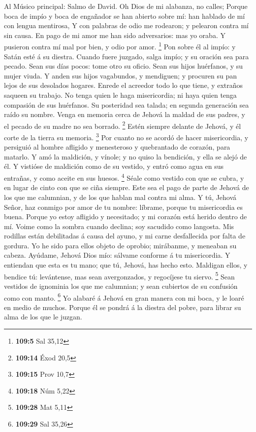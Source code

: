  Al Músico principal: Salmo de David. Oh Dios de mi
alabanza, no calles;  Porque boca de impío y boca de
engañador se han abierto sobre mí: han hablado de mí con lengua
mentirosa,  Y con palabras de odio me rodearon; y pelearon
contra mí sin causa.  En pago de mi amor me han sido
adversarios: mas yo oraba.  Y pusieron contra mí mal por
bien, y odio por amor. \footnote{\textbf{109:5} Sal 35,12} 
Pon sobre él al impío: y Satán esté á su diestra.  Cuando
fuere juzgado, salga impío; y su oración sea para pecado. 
Sean sus días pocos: tome otro su oficio.  Sean sus hijos
huérfanos, y su mujer viuda.  Y anden sus hijos vagabundos,
y mendiguen; y procuren su pan lejos de sus desolados hogares.
 Enrede el acreedor todo lo que tiene, y extraños saqueen
su trabajo.  No tenga quien le haga misericordia; ni haya
quien tenga compasión de sus huérfanos.  Su posteridad sea
talada; en segunda generación sea raído su nombre.  Venga
en memoria cerca de Jehová la maldad de sus padres, y el pecado de su
madre no sea borrado. \footnote{\textbf{109:14} Éxod 20,5} 
Estén siempre delante de Jehová, y él corte de la tierra su memoria.
\footnote{\textbf{109:15} Prov 10,7}  Por cuanto no se
acordó de hacer misericordia, y persiguió al hombre afligido y
menesteroso y quebrantado de corazón, para matarlo.  Y amó
la maldición, y vínole; y no quiso la bendición, y ella se alejó de él.
 Y vistióse de maldición como de su vestido, y entró como
agua en sus entrañas, y como aceite en sus huesos. \footnote{\textbf{109:18}
  Núm 5,22}  Séale como vestido con que se cubra, y en
lugar de cinto con que se ciña siempre.  Este sea el pago
de parte de Jehová de los que me calumnian, y de los que hablan mal
contra mi alma.  Y tú, Jehová Señor, haz conmigo por amor
de tu nombre: líbrame, porque tu misericordia es buena. 
Porque yo estoy afligido y necesitado; y mi corazón está herido dentro
de mí.  Voime como la sombra cuando declina; soy sacudido
como langosta.  Mis rodillas están debilitadas á causa del
ayuno, y mi carne desfallecida por falta de gordura.  Yo he
sido para ellos objeto de oprobio; mirábanme, y meneaban su cabeza.
 Ayúdame, Jehová Dios mío: sálvame conforme á tu
misericordia.  Y entiendan que esta es tu mano; que tú,
Jehová, has hecho esto.  Maldigan ellos, y bendice tú:
levántense, mas sean avergonzados, y regocíjese tu siervo. \footnote{\textbf{109:28}
  Mat 5,11}  Sean vestidos de ignominia los que me
calumnian; y sean cubiertos de su confusión como con manto. \footnote{\textbf{109:29}
  Sal 35,26}  Yo alabaré á Jehová en gran manera con mi
boca, y le loaré en medio de muchos.  Porque él se pondrá á
la diestra del pobre, para librar su alma de los que le juzgan.

